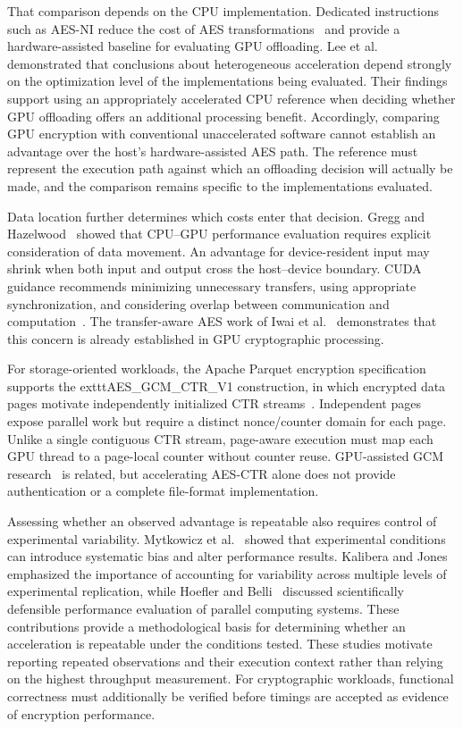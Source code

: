 That comparison depends on the CPU implementation. Dedicated instructions such as AES-NI reduce
the cost of AES transformations~\cite{intel2012aesni} and provide a hardware-assisted baseline
for evaluating GPU offloading. Lee et al.~\cite{lee2010debunking} demonstrated that conclusions
about heterogeneous acceleration depend strongly on the optimization level of the
implementations being evaluated. Their findings support using an appropriately accelerated CPU
reference when deciding whether GPU offloading offers an additional processing benefit.
Accordingly, comparing GPU encryption with conventional unaccelerated software cannot establish
an advantage over the host's hardware-assisted AES path. The reference must represent the
execution path against which an offloading decision will actually be made, and the comparison
remains specific to the implementations evaluated.

Data location further determines which costs enter that decision. Gregg and
Hazelwood~\cite{gregg2011data} showed that CPU--GPU performance evaluation requires explicit
consideration of data movement. An advantage for device-resident input may shrink when both
input and output cross the host--device boundary. CUDA guidance recommends minimizing
unnecessary transfers, using appropriate synchronization, and considering overlap between
communication and computation~\cite{nvidiaBestPractices,harris2012overlap}. The transfer-aware
AES work of Iwai et al.~\cite{iwai2012acceleration} demonstrates that this concern is already
established in GPU cryptographic processing.

For storage-oriented workloads, the Apache Parquet encryption specification
supports the 	exttt{AES\_GCM\_CTR\_V1} construction, in which encrypted data
pages motivate independently initialized CTR streams~\cite{parquet_encryption_spec}.
Independent pages expose parallel work but require a distinct nonce/counter domain
for each page. Unlike a single contiguous CTR stream, page-aware execution must
map each GPU thread to a page-local counter without counter reuse. GPU-assisted
GCM research~\cite{schonberger2011gpu,lee2025parallelgcm} is related, but
accelerating AES-CTR alone does not provide authentication or a complete file-format implementation.

Assessing whether an observed advantage is repeatable also requires control of experimental
variability. Mytkowicz et al.~\cite{mytkowicz2009wrong} showed that experimental conditions can
introduce systematic bias and alter performance results. Kalibera and
Jones~\cite{kalibera2013rigorous} emphasized the importance of accounting for variability across
multiple levels of experimental replication, while Hoefler and
Belli~\cite{hoefler2015scientific} discussed scientifically defensible performance evaluation of
parallel computing systems. These contributions provide a methodological basis for determining
whether an acceleration is repeatable under the conditions tested. These studies motivate
reporting repeated observations and their execution context rather than relying on the highest
throughput measurement. For cryptographic workloads, functional correctness must additionally be
verified before timings are accepted as evidence of encryption performance.

